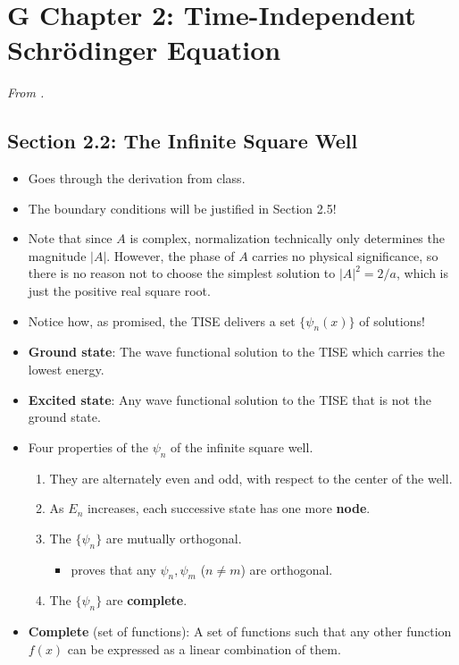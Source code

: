 \documentclass[../notes.tex]{subfiles}
\begin{document}
\section{G Chapter 2: Time-Independent Schr\"{o}dinger Equation}
\emph{From \textcite{bib:Griffiths}.}
\subsection*{Section 2.2: The Infinite Square Well}
\begin{itemize}
    \item {}Goes through the derivation from class.
    \item The boundary conditions will be justified in Section 2.5!
    \item Note that since $A$ is complex, normalization technically only determines the magnitude $|A|$. However, the phase of $A$ carries no physical significance, so there is no reason not to choose the simplest solution to $|A|^2=2/a$, which is just the positive real square root.
    \item Notice how, as promised, the TISE delivers a set $\{\psi_n(x)\}$ of solutions!
    \item \textbf{Ground state}: The wave functional solution to the TISE which carries the lowest energy.
    \item \textbf{Excited state}: Any wave functional solution to the TISE that is not the ground state.
    \item Four properties of the $\psi_n$ of the infinite square well.
    \begin{enumerate}
        \item They are alternately even and odd, with respect to the center of the well.
        \item As $E_n$ increases, each successive state has one more \textbf{node}.
        \item The $\{\psi_n\}$ are mutually orthogonal.
        \begin{itemize}
            \item \textcite{bib:Griffiths} proves that any $\psi_n,\psi_m$ ($n\neq m$) are orthogonal.
        \end{itemize}
        \item The $\{\psi_n\}$ are \textbf{complete}.
    \end{enumerate}
    \item \textbf{Complete} (set of functions): A set of functions such that any other function $f(x)$ can be expressed as a linear combination of them.

\end{itemize}
\end{document}
